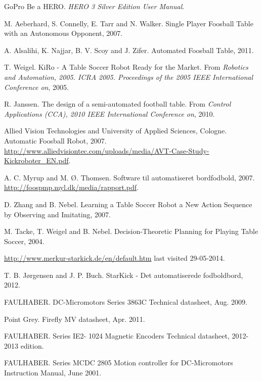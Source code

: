 \begin{thebibliography}{1}

 GoPro Be a HERO.
\emph{HERO 3 Silver Edition User Manual}.

 M. Aeberhard, S. Connelly, E. Tarr and N. Walker. Single Player Foosball Table with an Autonomous Opponent, 2007.

 A. Alsalihi, K. Najjar, B. V. Scoy and J. Zifer. Automated Foosball Table, 2011.

 T. Weigel. KiRo - A Table Soccer Robot Ready for the Market. From \emph{Robotics and Automation, 2005. ICRA 2005. Proceedings of the 2005 IEEE International Conference on}, 2005.

 R. Janssen. The design of a semi-automated football table. From \emph{Control Applications (CCA), 2010 IEEE International Conference on}, 2010.

 Allied Vision Technologies and University of Applied Sciences, Cologne. Automatic Foosball Robot, 2007. \url{http://www.alliedvisiontec.com/uploads/media/AVT-Case-Study-Kickroboter_EN.pdf}.


 A. C. Myrup and M. Ø. Thomsen. Software til automatiseret bordfodbold, 2007. \url{http://foospmp.myl.dk/media/rapport.pdf}.

 D. Zhang and B. Nebel. Learning a Table Soccer Robot a New Action Sequence
by Observing and Imitating, 2007.

 M. Tacke, T. Weigel and B. Nebel. Decision-Theoretic Planning for Playing
Table Soccer, 2004.

 \url{http://www.merkur-starkick.de/en/default.htm} last visited 29-05-2014.

  T. B. Jørgensen and J. P. Buch. StarKick - Det automatiserede fodboldbord, 2012.

 FAULHABER. DC-Micromotors Series 3863C Technical datasheet, Aug. 2009.

 Point Grey. Firefly MV datasheet, Apr. 2011.

 FAULHABER. Series IE2- 1024 Magnetic Encoders Technical datasheet, 2012-2013 edition.

 FAULHABER. Series MCDC 2805 Motion controller for DC-Micromotors Instruction Manual, June 2001.


\end{thebibliography}
